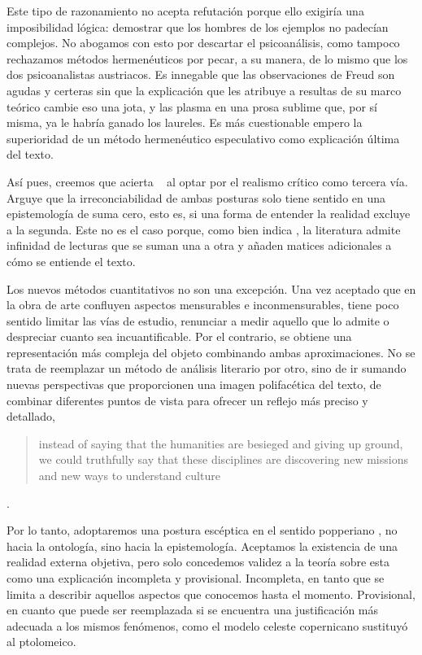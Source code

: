 Este tipo de razonamiento no acepta refutación porque ello exigiría una imposibilidad lógica: demostrar que los hombres de los ejemplos no padecían complejos. No abogamos con esto por descartar el psicoanálisis, como tampoco rechazamos métodos hermenéuticos por pecar, a su manera, de lo mismo que los dos psicoanalistas austriacos. Es innegable que las observaciones de Freud son agudas y certeras sin que la explicación que les atribuye a resultas de su marco teórico cambie eso una jota, y las plasma en una prosa sublime que, por sí misma, ya le habría ganado los laureles. Es más cuestionable empero la superioridad de un método hermenéutico especulativo como explicación última del texto.

Así pues, creemos que acierta \citeauthor{escobar2021}~\parencite*[35-40]{escobar2021} al optar por el realismo crítico como tercera vía. Arguye que la irreconciabilidad de ambas posturas solo tiene sentido en una epistemología de suma cero, esto es, si una forma de entender la realidad excluye a la segunda. Este no es el caso porque, como bien indica \citeauthor{cameron2011}, la literatura admite infinidad de lecturas que se suman una a otra y añaden matices adicionales a cómo se entiende el texto.

Los nuevos métodos cuantitativos no son una excepción. Una vez aceptado que en la obra de arte confluyen aspectos mensurables e inconmensurables, tiene poco sentido limitar las vías de estudio, renunciar a medir aquello que lo admite o despreciar cuanto sea incuantificable. Por el contrario, se obtiene una representación más compleja del objeto combinando ambas aproximaciones. No se trata de reemplazar un método de análisis literario por otro, sino de ir sumando nuevas perspectivas que proporcionen una imagen polifacética del texto, de combinar diferentes puntos de vista para ofrecer un reflejo más preciso y detallado, \blockquote{\begin{english}instead of saying that the humanities are besieged and giving up ground, we could truthfully say that these disciplines are discovering new missions and new ways to understand culture\end{english}} \parencite{underwood2019}.

Por lo tanto, adoptaremos una postura escéptica en el sentido popperiano \parencite{popper2002}, no hacia la ontología, sino hacia la epistemología. Aceptamos la existencia de una realidad externa objetiva, pero solo concedemos validez a la teoría sobre esta como una explicación incompleta y provisional. Incompleta, en tanto que se limita a describir aquellos aspectos que conocemos hasta el momento. Provisional, en cuanto que puede ser reemplazada si se encuentra una justificación más adecuada a los mismos fenómenos, como el modelo celeste copernicano sustituyó al ptolomeico.

